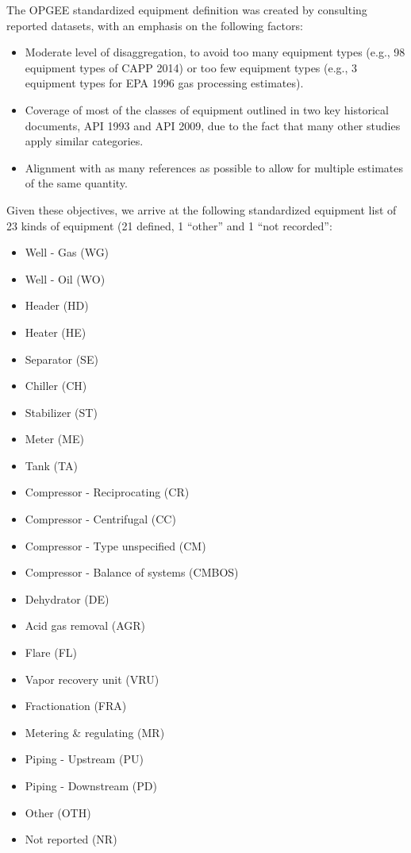 \documentclass[11pt]{report}
\begin{document}
{{{{The OPGEE standardized equipment definition was created by consulting reported datasets, with an emphasis on the following factors:
\begin{itemize}
\item Moderate level of disaggregation, to avoid too many equipment types (e.g., 98 equipment types of CAPP 2014) or too few equipment types (e.g., 3 equipment types for EPA 1996 gas processing estimates).
\item Coverage of most of the classes of equipment outlined in two key historical documents, API 1993 and API 2009, due to the fact that many other studies apply similar categories.
\item Alignment with as many references as possible to allow for multiple estimates of the same quantity. 
\end{itemize}
Given these objectives, we arrive at the following standardized equipment list of 23 kinds of equipment (21 defined, 1 ``other'' and 1 ``not recorded'':
\begin{itemize}
\item Well - Gas (WG)
\item Well - Oil	(WO)
\item Header	(HD)
\item Heater	(HE)
\item Separator	(SE)
\item Chiller	(CH)
\item Stabilizer	(ST)
\item Meter	(ME)
\item Tank		(TA)
\item Compressor - Reciprocating	(CR)
\item Compressor - Centrifugal	(CC)
\item Compressor - Type unspecified	 (CM)
\item Compressor - Balance of systems (CMBOS)
\item Dehydrator	(DE)
\item Acid gas removal	(AGR)
\item Flare	(FL)
\item Vapor recovery unit	(VRU)
\item Fractionation	(FRA)
\item Metering \& regulating	(MR)
\item Piping - Upstream	(PU)
\item Piping - Downstream	(PD)
\item Other	(OTH)
\item Not reported	(NR)
\end{itemize}

}}}}
\end{document}
